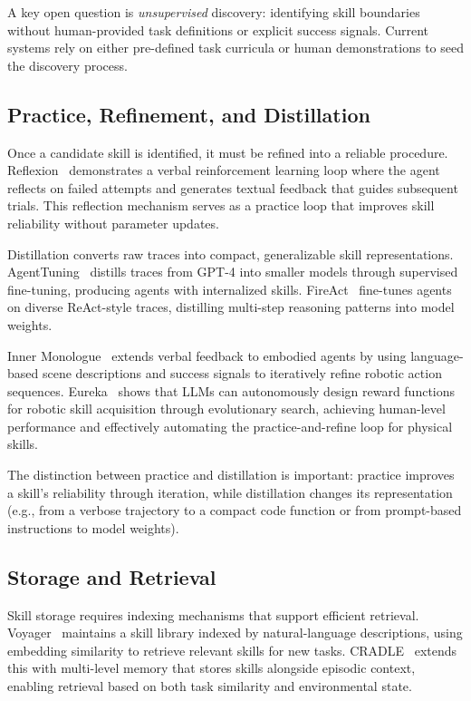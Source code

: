 \documentclass[conference, compsoc]{IEEEtran}
\theoremstyle{plain}
\begin{document}
A key open question is \emph{unsupervised} discovery: identifying skill boundaries without human-provided task definitions or explicit success signals. Current systems rely on either pre-defined task curricula or human demonstrations to seed the discovery process.

\subsection{Practice, Refinement, and Distillation}
\label{sec:lifecycle:practice}

Once a candidate skill is identified, it must be refined into a reliable procedure. Reflexion~\cite{shinn2023reflexion} demonstrates a verbal reinforcement learning loop where the agent reflects on failed attempts and generates textual feedback that guides subsequent trials. This reflection mechanism serves as a practice loop that improves skill reliability without parameter updates.

Distillation converts raw traces into compact, generalizable skill representations. AgentTuning~\cite{zeng2023agenttuning} distills traces from GPT-4 into smaller models through supervised fine-tuning, producing agents with internalized skills. FireAct~\cite{chen2023fireact} fine-tunes agents on diverse ReAct-style traces, distilling multi-step reasoning patterns into model weights.

Inner Monologue~\cite{huang2022innermonologue} extends verbal feedback to embodied agents by using language-based scene descriptions and success signals to iteratively refine robotic action sequences. Eureka~\cite{ma2024eureka} shows that LLMs can autonomously design reward functions for robotic skill acquisition through evolutionary search, achieving human-level performance and effectively automating the practice-and-refine loop for physical skills.

The distinction between practice and distillation is important: practice improves a skill's reliability through iteration, while distillation changes its representation (e.g., from a verbose trajectory to a compact code function or from prompt-based instructions to model weights).

\subsection{Storage and Retrieval}
\label{sec:lifecycle:storage}

Skill storage requires indexing mechanisms that support efficient retrieval. Voyager~\cite{wang2023voyager} maintains a skill library indexed by natural-language descriptions, using embedding similarity to retrieve relevant skills for new tasks. CRADLE~\cite{tan2024cradle} extends this with multi-level memory that stores skills alongside episodic context, enabling retrieval based on both task similarity and environmental state.
\end{document}
